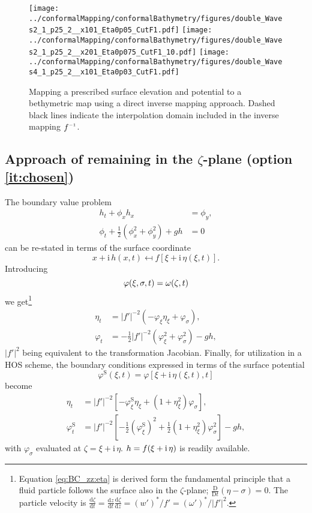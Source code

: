 \documentclass[internal]{sintefmemo}
\newcommand{\mr}{\mathrm}
\renewcommand{\S}{^\mr{S}}
\newcommand{\ii}{\mr{i}\,}
\renewcommand{\_}[1]{_\mr{#1}}
\let\Re\relax
\let\Im\relax
\DeclareMathOperator\Re{Re}
\DeclareMathOperator\Im{Im}
\newcommand{\w}{w}
\newcommand{\rbr}[1]{\left(#1\right)}
\newcommand{\sbr}[1]{\left[#1\right]}
\newcommand{\z}{z}
\newcommand{\x}{x}
\newcommand{\zz}{\zeta}
\newcommand{\xx}{\xi}
\newcommand{\yy}{\sigma}
\newcommand{\zmap}{f}
\newcommand{\zzmap}{\zmap^{\raisebox{.2ex}{$\scriptscriptstyle-1$}}}
\newcommand{\ww}{\omega}
\renewcommand{\w}{w}
\newcommand{\dd}{\mr d}
\newcommand{\ddfrac}[2]{\frac{\dd #1}{\dd #2}}
\begin{document}
\begin{figure}[h!ptb]%
\centering
{\texttt{[image: ../conformalMapping/conformalBathymetry/figures/double\_nWaves2\_h1\_0p25\_h2\_1\_nx101\_aEta0p05\_kCutF1.pdf]}}%
{\texttt{[image: ../conformalMapping/conformalBathymetry/figures/double\_nWaves2\_h1\_0p25\_h2\_1\_nx201\_aEta0p075\_kCutF1\_L10.pdf]}}
{\texttt{[image: ../conformalMapping/conformalBathymetry/figures/double\_nWaves4\_h1\_0p25\_h2\_1\_nx101\_aEta0p03\_kCutF1.pdf]}}
\caption{Mapping a prescribed surface elevation and potential to a bethymetric map using a direct inverse mapping approach. Dashed black lines indicate the interpolation domain included in the inverse mapping $\zzmap$.}%
\label{fig:res:double2}%
\end{figure}


\subsection{Approach of remaining in the $\zz$-plane (option \ref{it:chosen})}
\label{sec:zz-planeApproach}
The boundary value problem 
\begin{align*}
h_t + \phi_x h_x&=\phi_y,\\
\phi_t + \frac12\rbr{\phi_x^2+\phi_y^2}+gh&=0
\end{align*}
can be re-stated in terms of the surface coordinate
\[
\x+\ii h(\x,t) \mapsfrom f[\xx+\ii \eta(\xx,t)].
\]
Introducing
\[\varphi(\xx,\yy,t)=\Re\ww(\zz,t) \]
we get\footnote{
Equation \eqref{eq:BC_zz:eta} is derived form the fundamental principle that a fluid particle follows the surface also in the $\zz$-plane; $\frac{\mr D}{\mr D t}(\eta-\yy)=0$. The particle velocity is 
$\ddfrac\zz t = \ddfrac\z t \ddfrac\zz\z =(\w')^*/f'=(\ww')^*\big/|f'|^2$.
}
\begin{subequations}
\begin{align}
\eta_t &= |\zmap'|^{-2}  \rbr{ -  \varphi_\xx\eta_\xx  +  \varphi_\yy}, \label{eq:BC_zz:eta} \\
\varphi_t &=   - \frac12 |\zmap'|^{-2} \rbr{\varphi_\xx^2+\varphi_\yy^2}  - g h,
\end{align}%
\label{eq:BC_zz}%
\end{subequations}%
$|\zmap'|^{2}$ being equivalent to the transformation Jacobian. 
Finally, for utilization in a HOS scheme, the boundary conditions expressed in terms of the surface potential 
\[
\varphi\S(\xx,t)=\varphi[\xx+\ii\eta(\xx,t),t]
\]
become
\begin{subequations}
\begin{align}
\eta_t &= |\zmap'|^{-2} \sbr{-   \varphi\S_\xx\eta_\xx + \rbr{1+\eta_\xx^2} \varphi_\yy},\\
\varphi\S_t  &= |\zmap'|^{-2}\sbr{ - \frac12  \rbr{\varphi\S_\xx}^2 + \frac12 \rbr{1+\eta_\xx^2} \varphi_\yy^2 }  - g h,
\end{align}%
\end{subequations}%
with  $\varphi_\yy$ evaluated at $\zz=\xx+\ii\eta$.
$h=\Im \zmap(\xx+\ii\eta)$ is readily available. 
\end{document}
